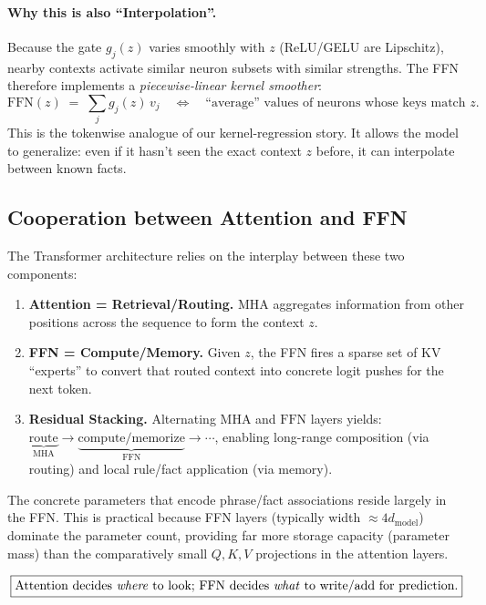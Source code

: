 \documentclass{article}
\begin{document}
\paragraph{Why this is also ``Interpolation''.}
Because the gate $g_j(z)$ varies smoothly with $z$ (ReLU/GELU are Lipschitz), nearby contexts activate similar neuron subsets with similar strengths. The FFN therefore implements a \emph{piecewise-linear kernel smoother}:
\[
\mathrm{FFN}(z)\;=\;\sum_j g_j(z)\,v_j
\quad\Longleftrightarrow\quad
\text{``average'' values of neurons whose keys match $z$.}
\]
This is the tokenwise analogue of our kernel-regression story. It allows the model to generalize: even if it hasn't seen the exact context $z$ before, it can interpolate between known facts.

\subsection{Cooperation between Attention and FFN}

The Transformer architecture relies on the interplay between these two components:

\begin{enumerate}[leftmargin=1.2em]
\item \textbf{Attention = Retrieval/Routing.} MHA aggregates information from other positions across the sequence to form the context $z$.
\item \textbf{FFN = Compute/Memory.} Given $z$, the FFN fires a sparse set of KV “experts” to convert that routed context into concrete logit pushes for the next token.
\item \textbf{Residual Stacking.} Alternating \(\text{MHA}\) and \(\text{FFN}\) layers yields: \(\underbrace{\text{route}}_{\text{MHA}}\rightarrow\underbrace{\text{compute/memorize}}_{\text{FFN}}\rightarrow\cdots\), enabling long-range composition (via routing) and local rule/fact application (via memory).
\end{enumerate}

The concrete parameters that encode phrase/fact associations reside largely in the FFN. This is practical because FFN layers (typically width $\approx 4d_{\mathrm{model}}$) dominate the parameter count, providing far more storage capacity (parameter mass) than the comparatively small $Q,K,V$ projections in the attention layers.

\[
\boxed{\text{Attention decides \emph{where} to look; FFN decides \emph{what} to write/add for prediction.}}
\]
\end{document}
